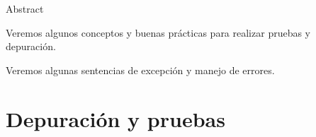 \documentclass[mathserif]{beamer}
\subtitle{%
  \bfseries{Pruebas, depuración y manejo de excepciones}\\%
}
\begin{document}


\begin{frame}{Abstract}
	
    
	\begin{blurb}
		Veremos algunos conceptos y buenas prácticas para realizar pruebas y depuración.
		
		Veremos algunas sentencias de {\blue excepción} y manejo de errores.
		
	\end{blurb}
\end{frame}

\section{Depuración y pruebas}
\end{document}
